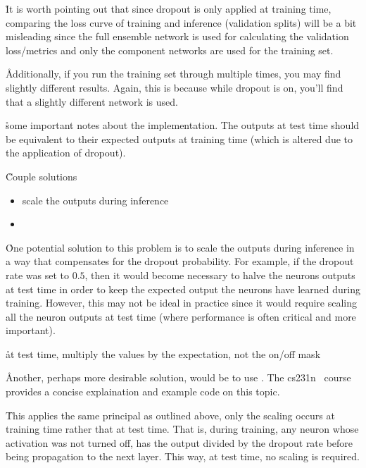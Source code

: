 \r{It is worth pointing out that since dropout is only applied at training time, comparing the loss curve of training and inference (validation splits) will be a bit misleading since the full ensemble network is used for calculating the validation loss/metrics and only the component  networks are used for the training set.}

\r{Additionally, if you run the training set through multiple times, you may find slightly different results. Again, this is because while dropout is on, you'll find that a slightly different network is used. }

\r{some important notes about the implementation. The outputs at test time should be equivalent to their expected outputs at training time (which is altered due to the application of dropout).}

\r{Couple solutions}
\begin{itemize}[noitemsep,topsep=0pt]
	\item scale the outputs during inference
	\item
\end{itemize}

\r{One potential solution to this problem is to scale the outputs during inference in a way that compensates for the dropout probability.  For example, if the dropout rate was set to $0.5$, then it would become necessary to halve the neurons outputs at test time in order to keep the expected output the neurons have learned during training.  However, this may not be ideal in practice since it would require scaling all the neuron outputs at test time (where performance is often critical and more important).}

\r{at test time, multiply the values by the expectation, not the on/off mask}

\r{Another, perhaps more desirable solution, would be to use . The cs231n~\cite{cs231n} course provides a concise explaination and example code on this topic.}

\r{This applies the same principal as outlined above, only the scaling occurs at training time rather that at test time. That is, during training, any neuron whose activation was not turned off, has the output divided by the dropout rate before being propagation to the next layer.  This way, at test time, no scaling is required.}



